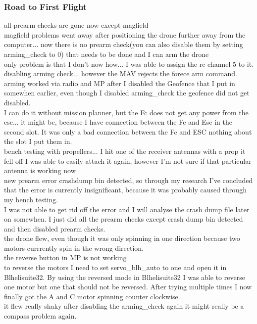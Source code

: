 \documentclass{article}
\begin{document}
	\subsubsection{Road to First Flight}
	all prearm checks are gone now except magfield
	\\ magfield problems went away after positioning the drone further away from the computer... now there is no prearm check(you can also disable them by setting arming\_check to 0) that needs to be done and I can arm the drone
	\\ only problem is that I don't now how... I was able to assign the rc channel 5 to it. 
	\\ disabling arming check... however the MAV rejects the forece arm command. 
	\\ arming worked via radio and MP after I disabled the Geofence that I put in somewhen earlier, even though I disabled arming\_check the geofence did not get disabled.
	\\ I can do it without mission planner, but the Fc does not get any power from the esc... it might be, because I have connection between the Fc and Esc in the second slot. It was only a bad connection between the Fc and ESC nothing about the slot I put them in. 
	\\ bench testing with propellers... I hit one of the receiver antennas with a prop it fell off I was able to easily attach it again, however I'm not sure if that particular antenna is working now
	\\ new prearm error crashdump bin detected, so through my research I've concluded that the error is currently insignificant, because it was probably caused through my bench testing.
	\\ I was not able to get rid off the error and I will analyse the crash dump file later on somewhen. I just did all the prearm checks except crash dump bin detected and then disabled prearm checks. 
	\\ the drone flew, even though it was only spinning in one direction because two motors currrently spin in the wrong direction.
	\\ the reverse button in MP is not working
	\\ to reverse the motors I need to set servo\_blh\_auto to one and open it in Blhelisuite32\cite{BLHeliSuite32}. By using the reversed mode in Blhelisuite32 I was able to reverse one motor but one that should not be reversed. After trying multiple times I now finally got the A and C motor spinning counter clockwise. 
	\\ it flew really shaky after disabling the arming\_check again it might really be a compass problem again.
\end{document}
